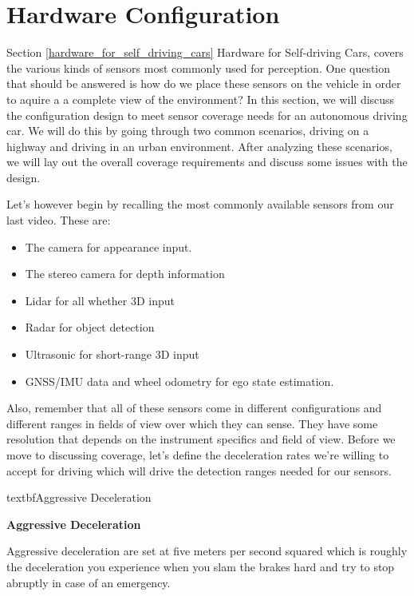 \section{Hardware Configuration}
\label{hardware_configuration}
Section \ref{hardware_for_self_driving_cars} Hardware for Self-driving Cars, covers the various kinds of sensors most commonly used for perception. 
One question that should be answered is how do we place these sensors on the vehicle in order to 
aquire a a complete view of the environment? 
In this section, we will discuss the configuration design to meet sensor coverage needs for an autonomous driving car. 
We will do this by going through two common scenarios, driving on a highway and driving in an urban environment. 
After analyzing these scenarios, we will lay out the overall coverage requirements and discuss some issues with the design. 

Let's however begin by recalling the most commonly available sensors from our last video. 
These are:

\begin{itemize}
\item  The camera for appearance input. 
\item The stereo camera for depth information
\item Lidar for all whether 3D input
\item Radar for object detection
\item Ultrasonic for short-range 3D input 
\item GNSS/IMU data and wheel odometry for ego state estimation. 
\end{itemize}

Also, remember that all of these sensors come in different configurations and  different ranges in fields of view over which they can sense. 
They have some resolution that depends on the instrument specifics and field of view. 
Before we move to discussing coverage, let's define the deceleration rates we're willing to accept for driving which will drive the detection ranges needed for our sensors. 

{textbf{Aggressive Deceleration}}


\begin{framed}
\theoremstyle{remark}
\begin{remark}{\textbf{Aggressive Deceleration}}

Aggressive deceleration are set at five meters per second squared which is roughly the deceleration you experience when you slam the brakes hard and try to stop abruptly in case of an emergency. 
\end{remark}
\end{framed}

